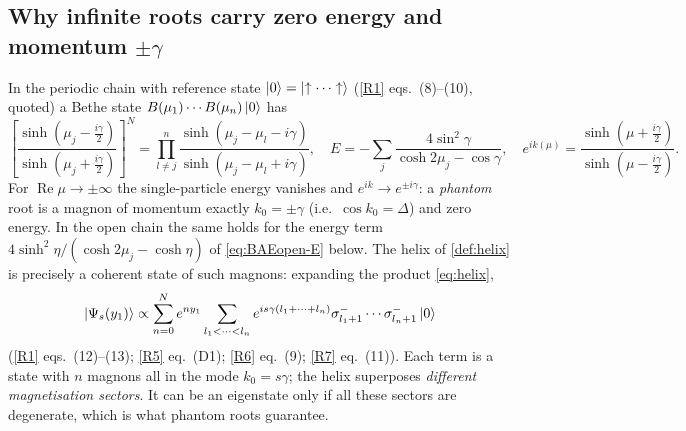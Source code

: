\documentclass[11pt,a4paper]{article}
\theoremstyle{definition}
\newcommand{\re}{\operatorname{Re}}
\begin{document}
\subsection{Why infinite roots carry zero energy and momentum $\pm\gamma$}
In the periodic chain with reference state $\ket{0}=\ket{\uparrow\cdots\uparrow}$ (\ref{R1} eqs.~(8)--(10), quoted) a Bethe state $B(\mu_1)\cdots B(\mu_n)\ket0$ has
\begin{equation}\label{eq:BAEper}
\left[\frac{\sinh(\mu_j-\frac{i\gamma}2)}{\sinh(\mu_j+\frac{i\gamma}2)}\right]^N=\prod_{l\neq j}^{n}\frac{\sinh(\mu_j-\mu_l-i\gamma)}{\sinh(\mu_j-\mu_l+i\gamma)},\quad
E=-\sum_j\frac{4\sin^2\gamma}{\cosh2\mu_j-\cos\gamma},\quad e^{ik(\mu)}=\frac{\sinh(\mu+\frac{i\gamma}2)}{\sinh(\mu-\frac{i\gamma}2)}.
\end{equation}
For $\re\mu\to\pm\infty$ the single-particle energy vanishes and $e^{ik}\to e^{\pm i\gamma}$: a \emph{phantom} root is a magnon of momentum exactly $k_0=\pm\gamma$ (i.e.\ $\cos k_0=\Delta$) and zero energy. In the open chain the same holds for the energy term $4\sinh^2\eta/(\cosh2\mu_j-\cosh\eta)$ of \eqref{eq:BAEopen-E} below. The helix of \cref{def:helix} is precisely a coherent state of such magnons: expanding the product \eqref{eq:helix},
\begin{equation}\label{eq:helix-expansion}
\ket{\Psi_s(y_1)}\propto\sum_{n=0}^{N}e^{n y_1}\sum_{l_1<\dots<l_n}e^{is\gamma(l_1+\dots+l_n)}\sigma^-_{l_1+1}\cdots\sigma^-_{l_n+1}\ket0
\end{equation}
(\ref{R1} eqs.~(12)--(13); \ref{R5} eq.~(D1); \ref{R6} eq.~(9); \ref{R7} eq.~(11)). Each term is a state with $n$ magnons all in the mode $k_0=s\gamma$; the helix superposes \emph{different magnetisation sectors}. It can be an eigenstate only if all these sectors are degenerate, which is what phantom roots guarantee.
\end{document}
